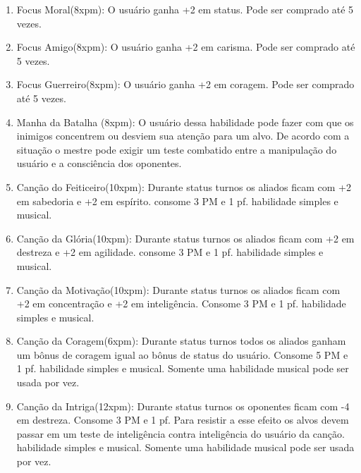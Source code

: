 \begin{enumerate}
  	\item Focus Moral(8xpm): O usuário ganha +2 em status. Pode ser comprado até 5 vezes.
  
  	\item Focus Amigo(8xpm): O usuário ganha +2 em carisma. Pode ser comprado até 5 vezes.
  
  	\item Focus Guerreiro(8xpm): O usuário ganha +2 em coragem. Pode ser comprado até 5 vezes.
  
		\item Manha da Batalha (8xpm):  O usuário dessa habilidade pode fazer com que os inimigos concentrem ou desviem sua atenção para um alvo. De acordo com a situação o mestre pode exigir um teste combatido entre a manipulação do usuário e a consciência dos oponentes.

		\item Canção do Feiticeiro(10xpm): Durante status turnos os aliados ficam com +2 em sabedoria e +2 em espírito. consome 3 PM e 1 pf. habilidade simples e musical. %
	
		\item Canção da Glória(10xpm): Durante status turnos os aliados ficam com +2 em destreza e +2 em agilidade. consome 3 PM e 1 pf. habilidade simples e musical. %
		
		\item Canção da Motivação(10xpm): Durante status turnos os aliados ficam com +2 em concentração e +2 em inteligência. Consome 3 PM e 1 pf. habilidade simples e musical. %
		
		\item Canção da Coragem(6xpm): Durante status turnos todos os aliados ganham um bônus de coragem igual ao bônus de status do usuário. Consome 5 PM e 1 pf. habilidade simples e musical. Somente uma habilidade musical pode ser usada por vez.
	
		\item Canção da Intriga(12xpm): Durante status turnos os oponentes ficam com -4 em destreza. Consome 3 PM e 1 pf. Para resistir a esse efeito os alvos devem passar em um teste de inteligência contra inteligência do usuário da canção. habilidade simples e musical. Somente uma habilidade musical pode ser usada por vez. 
		

\end{enumerate}
